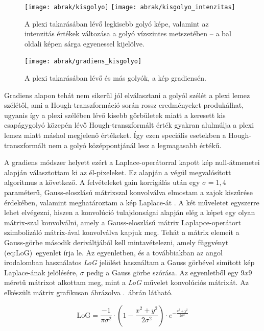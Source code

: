 \documentclass[a4paper,12pt]{article}
\begin{document}
\begin{figure}[htbp]
\center
\texttt{[image: abrak/kisgolyo]}
\texttt{[image: abrak/kisgolyo\_intenzitas]}
\caption{A plexi takarásában lévő legkisebb golyó képe, valamint az intenzitás értékek változása a golyó vízszintes metszetében -- a bal oldali képen sárga egyenessel kijelölve.}
\label{fig:kisgolyo1}
\end{figure}


\begin{figure}[htbp]
\center
\texttt{[image: abrak/gradiens\_kisgolyo]}
\caption{A plexi takarásában lévő és más golyók, a kép gradiensén.}
\label{fig:kisgolyo2}
\end{figure}

Gradiens alapon tehát nem sikerül jól elválasztani a golyól szélét a plexi lemez szélétől, ami a Hough-transzformáció során rossz eredményeket produkálhat, ugyanis így  a plexi szélében lévő kisebb görbületek miatt a keresett kis csapágygolyó közepén lévő Hough-transzformált érték gyakran alulmúlja a plexi lemez miatt máshol megjelenő értékeket. Így ezen speciális esetekben a Hough-transzformált nem a golyó középpontjánál lesz a legmagasabb értékű.


A gradiens módszer helyett ezért a Laplace-operátorral kapott kép null-átmenetei alapján választottam ki az él-pixeleket. Ez alapján a végül megvalósított algoritmus a következő. A felvételeket gain korrigálás után egy $\sigma = 1,\!4$ paraméterű, Gauss-eloszlású mátrixszal konvolválva elmostam a zajok kiszűrése érdekében, valamint meghatároztam a kép Laplace-át . A két műveletet egyszerre lehet elvégezni, hiszen a konvolúció tulajdonságai alapján elég a képet egy olyan mátrix-szal konvolválni, amely a Gauss-eloszlású mátrix Laplapce-operátort szimbolizáló mátrix-ával konvolválva kapjuk meg.  Tehát a mátrix elemeit a Gauss-görbe második deriváltjából kell mintavételezni, amely függvényt \aref({eq:LoG})~egyenlet írja le. Az egyenletben, és a továbbiakban az angol irodalomban használatos \emph{LoG} jelölést használtam a Gauss görbével simított kép Laplace-ának jelölésére, $\sigma$ pedig a Gauss görbe szórása. Az egyenletből egy $9x9$ méretű mátrixot alkottam meg, mint a \emph{LoG} művelet konvolúciós mátrixát. Az elkészült mátrix grafikusan ábrázolva .~ábrán látható.

\begin{equation}
\label{eq:LoG}
\text{LoG} = \frac{-1}{\pi \sigma^2} \cdot \left ( 1-\frac{x^2+y^2}{2\sigma^2} \right ) \cdot e^{-\frac{x^2+y^2}{2\sigma^2}}
\end{equation}
\end{document}
